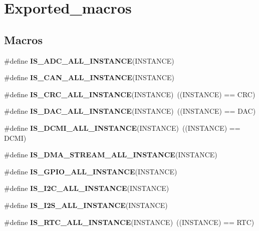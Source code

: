 \hypertarget{group___exported__macros}{}\section{Exported\+\_\+macros}
\label{group___exported__macros}
\subsection*{Macros}
\begin{DoxyCompactItemize}
\item 
\#define {\bfseries I\+S\+\_\+\+A\+D\+C\+\_\+\+A\+L\+L\+\_\+\+I\+N\+S\+T\+A\+N\+CE}(I\+N\+S\+T\+A\+N\+CE)
\item 
\#define {\bfseries I\+S\+\_\+\+C\+A\+N\+\_\+\+A\+L\+L\+\_\+\+I\+N\+S\+T\+A\+N\+CE}(I\+N\+S\+T\+A\+N\+CE)
\item 
\#define {\bfseries I\+S\+\_\+\+C\+R\+C\+\_\+\+A\+L\+L\+\_\+\+I\+N\+S\+T\+A\+N\+CE}(I\+N\+S\+T\+A\+N\+CE)~((I\+N\+S\+T\+A\+N\+CE) == C\+RC)\hypertarget{group___exported__macros_gaa514941a7f02f65eb27450c05e4e8dd1}{}\label{group___exported__macros_gaa514941a7f02f65eb27450c05e4e8dd1}

\item 
\#define {\bfseries I\+S\+\_\+\+D\+A\+C\+\_\+\+A\+L\+L\+\_\+\+I\+N\+S\+T\+A\+N\+CE}(I\+N\+S\+T\+A\+N\+CE)~((I\+N\+S\+T\+A\+N\+CE) == D\+AC)\hypertarget{group___exported__macros_ga94426b97cc5f1644d67f291cbcdba6d8}{}\label{group___exported__macros_ga94426b97cc5f1644d67f291cbcdba6d8}

\item 
\#define {\bfseries I\+S\+\_\+\+D\+C\+M\+I\+\_\+\+A\+L\+L\+\_\+\+I\+N\+S\+T\+A\+N\+CE}(I\+N\+S\+T\+A\+N\+CE)~((I\+N\+S\+T\+A\+N\+CE) == D\+C\+MI)\hypertarget{group___exported__macros_gaca27f42a2f7dd5715c74884bd9af310d}{}\label{group___exported__macros_gaca27f42a2f7dd5715c74884bd9af310d}

\item 
\#define {\bfseries I\+S\+\_\+\+D\+M\+A\+\_\+\+S\+T\+R\+E\+A\+M\+\_\+\+A\+L\+L\+\_\+\+I\+N\+S\+T\+A\+N\+CE}(I\+N\+S\+T\+A\+N\+CE)
\item 
\#define {\bfseries I\+S\+\_\+\+G\+P\+I\+O\+\_\+\+A\+L\+L\+\_\+\+I\+N\+S\+T\+A\+N\+CE}(I\+N\+S\+T\+A\+N\+CE)
\item 
\#define {\bfseries I\+S\+\_\+\+I2\+C\+\_\+\+A\+L\+L\+\_\+\+I\+N\+S\+T\+A\+N\+CE}(I\+N\+S\+T\+A\+N\+CE)
\item 
\#define {\bfseries I\+S\+\_\+\+I2\+S\+\_\+\+A\+L\+L\+\_\+\+I\+N\+S\+T\+A\+N\+CE}(I\+N\+S\+T\+A\+N\+CE)
\item 
\#define {\bfseries I\+S\+\_\+\+R\+T\+C\+\_\+\+A\+L\+L\+\_\+\+I\+N\+S\+T\+A\+N\+CE}(I\+N\+S\+T\+A\+N\+CE)~((I\+N\+S\+T\+A\+N\+CE) == R\+TC)\hypertarget{group___exported__macros_gab4230e8bd4d88adc4250f041d67375ce}{}\label{group___exported__macros_gab4230e8bd4d88adc4250f041d67375ce}


\end{DoxyCompactItemize}
